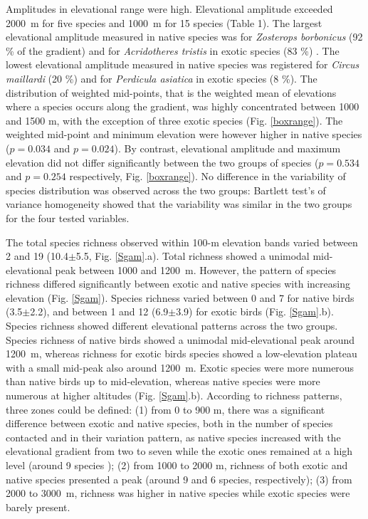 \documentclass{article}
\begin{document}
Amplitudes in elevational range were high. Elevational amplitude exceeded 2000~m for five species and 1000~m for 15 species (Table 1). The largest elevational amplitude measured in native species was for \textit{Zosterops borbonicus} (92 \% of the gradient) and for \textit{Acridotheres tristis} in exotic species (83 \%) . The lowest elevational amplitude measured in native species was registered for \textit{Circus maillardi} (20 \%) and for \textit{Perdicula asiatica} in exotic species (8 \%). The distribution of weighted mid-points, that is the weighted mean of elevations where a species occurs along the gradient, was highly concentrated between 1000 and 1500 m, with the exception of three exotic species (Fig. \ref{boxrange}). The weighted mid-point and minimum elevation were however higher in native species ($p=0.034$ and $p=0.024$). By contrast, elevational amplitude and maximum elevation did not differ significantly between the two groups of species ($p=0.534$ and $p=0.254$ respectively, Fig. \ref{boxrange}). No difference in the variability of species distribution was observed across the two groups: Bartlett test's of variance homogeneity showed that the variability was similar in the two groups for the four tested variables.

The total species richness observed within 100-m elevation bands varied between 2 and 19 (10.4$\pm$5.5, Fig. \ref{Sgam}.a). Total richness showed a unimodal mid-elevational peak between 1000 and 1200~m. However, the pattern of species richness differed significantly between exotic and native species with increasing elevation (Fig. \ref{Sgam}). Species richness varied between 0 and 7 for native birds (3.5$\pm$2.2), and between 1 and 12 (6.9$\pm$3.9) for exotic birds (Fig. \ref{Sgam}.b). Species richness showed different elevational patterns across the two groups. Species richness of native birds showed a unimodal mid-elevational peak around 1200~m, whereas richness for exotic birds species showed a low-elevation plateau with a small mid-peak also around 1200~m. Exotic species were more numerous than native birds up to mid-elevation, whereas native species were more numerous at higher altitudes (Fig. \ref{Sgam}.b). According to richness patterns, three zones could be defined: (1) from 0 to 900 m, there was a significant difference between exotic and native species, both in the number of species contacted and in their variation pattern, as native species increased with the elevational gradient from two to seven while the exotic ones remained at a high level (around 9 species ); (2) from 1000 to 2000 m, richness of both exotic and native species presented a peak (around 9 and 6 species, respectively); (3) from 2000 to 3000~m, richness was higher in native species while exotic species were barely present. 
\end{document}
